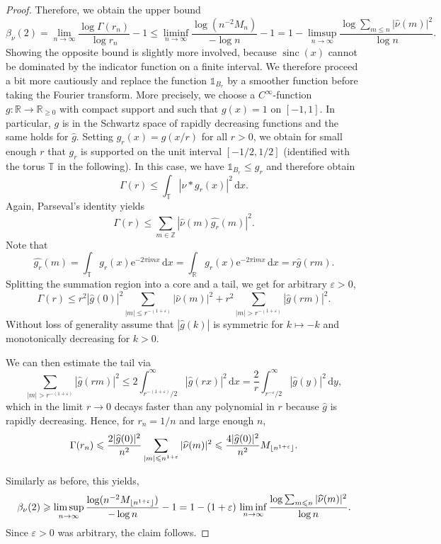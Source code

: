 \documentclass[11pt,reqno]{amsart}
\theoremstyle{plain}
\theoremstyle{definition}
\newcommand{\Z}{{\mathbb Z}}
\newcommand{\R}{{\mathbb R}}
\newcommand{\T}{{\mathbb T}}
\newcommand{\im}{{\mathrm{i}}}
\newcommand{\me}{\mathrm{e}}
\newcommand{\dd}{\,\mathrm{d}}
\newcommand{\sinc}{\operatorname{sinc}}
\DeclarePairedDelimiter{\floor}{\lfloor}{\rfloor}
\begin{document}
\begin{proof}
Therefore, we obtain the upper bound
\[
\beta_{\nu}(2) = \lim_{n \to \infty} \frac{\log \Gamma(r_n)}{\log r_n} -1
\leqslant \liminf_{n \to \infty} \frac{\log (n^{-2}  M_n)}{-\log n} -1 = 1 - \limsup_{n\to\infty}\frac{\log  \sum_{m \leqslant n} |\widehat{\nu}(m)|^2}{\log n}.
\]
Showing the opposite bound is slightly more involved, because $\sinc(x)$ cannot be dominated by the indicator function on a finite interval. We therefore proceed a bit more cautiously and replace the function $\mathds{1}_{B_r}$ by a smoother function before taking the Fourier transform. More precisely, we choose a $C^{\infty}$-function $g \colon \R \to \R_{\geqslant 0}$ with compact support and such that $g(x) = 1$ on $[-1,1]$.
In particular, $g$ is in the Schwartz space of rapidly decreasing functions and the same holds for $\widehat{g}$.
Setting $g_r(x) = g(x/r)$ for all $r > 0$, we obtain for small enough $r$ that $g_r$ is supported on the unit interval $[-1/2,1/2]$ (identified with the torus $\T$ in the following). In this case, we have $\mathds{1}_{B_r} \leqslant g_r$ and therefore obtain
\[
\Gamma(r) \leqslant \int_{\T} |\nu \ast g_r(x)|^2 \dd x.
\]
Again, Parseval's identity yields
\[
\Gamma(r) \leqslant \sum_{m \in \Z} |\widehat{\nu}(m) \widehat{g_r}(m)|^2.
\]
Note that 
\[
\widehat{g_r}(m) = \int_{\T} g_r(x) \me^{-2 \pi \im  m x} \dd x 
= \int_{\R} g_r(x) \me^{-2 \pi \im m x} \dd x
= r \widehat{g}(rm).
\]
Splitting the summation region into a core and a tail, we get for arbitrary $\varepsilon > 0$,
\[
\Gamma(r) 
\leqslant r^2 |\widehat{g}(0)|^2 \sum_{|m| \leqslant r^{-(1+\varepsilon)}} |\widehat{\nu}(m)|^2
+ r^2 \sum_{|m| > r^{-(1+\varepsilon)}} |\widehat{g}(rm)|^2.
\]
Without loss of generality assume that $|\widehat{g}(k)|$ is symmetric for $k \mapsto -k$ and monotonically decreasing for $k > 0$. 


We can then estimate the tail via
\[
\sum_{|m|> r^{-(1 + \varepsilon)}} |\widehat{g}(rm)|^2
\leqslant 2 \int_{r^{-(1+\varepsilon)}/2}^{\infty} |\widehat{g}(rx)|^2 \dd x
= \frac{2}{r} \int_{r^{-\varepsilon}/2}^{\infty} |\widehat{g}(y)|^2 \dd y,
\] 
which in the limit $r\to 0$ decays faster than any polynomial in $r$ because $\widehat{g}$ is rapidly decreasing. Hence, for $r_n = 1/n$ and large enough $n$,
\[
\Gamma(r_n) \leqslant \frac{2|\widehat{g}(0)|^2}{n^2} \sum_{|m| \leqslant n^{1+\varepsilon}}|\widehat{\nu}(m)|^2
\leqslant \frac{  4|\widehat{g}(0)|^2}{n^2} M_{\floor{n^{1+\varepsilon}}}.
\]

Similarly as before, this yields,
\[
\beta_{\nu}(2) \geqslant \limsup_{n \to \infty} \frac{\log(n^{-2} M_{\floor{n^{1+\varepsilon}}})}{-\log n} - 1 = 1 - (1 + \varepsilon)\, \liminf_{n\to\infty}\frac{\log  \sum_{m \leqslant n} |\widehat{\nu}(m)|^2}{\log n}.
\]
Since $\varepsilon > 0$ was arbitrary, the claim follows.
\end{proof}
\end{document}
